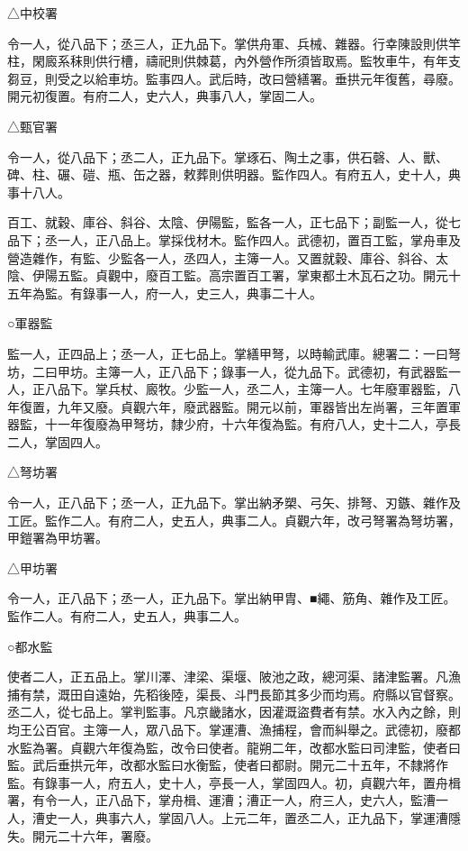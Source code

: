 \begin{pinyinscope}
 △中校署



 令一人，從八品下；丞三人，正九品下。掌供舟軍、兵械、雜器。行幸陳設則供竿柱，閑廄系秣則供行槽，禱祀則供棘葛，內外營作所須皆取焉。監牧車牛，有年支芻豆，則受之以給車坊。監事四人。武后時，改曰營繕署。垂拱元年復舊，尋廢。開元初復置。有府二人，史六人，典事八人，掌固二人。



 △甄官署



 令一人，從八品下；丞二人，正九品下。掌琢石、陶土之事，供石磬、人、獸、碑、柱、碾、磑、瓶、缶之器，敕葬則供明器。監作四人。有府五人，史十人，典事十八人。



 百工、就穀、庫谷、斜谷、太陰、伊陽監，監各一人，正七品下；副監一人，從七品下；丞一人，正八品上。掌採伐材木。監作四人。武德初，置百工監，掌舟車及營造雜作，有監、少監各一人，丞四人，主簿一人。又置就穀、庫谷、斜谷、太陰、伊陽五監。貞觀中，廢百工監。高宗置百工署，掌東都土木瓦石之功。開元十五年為監。有錄事一人，府一人，史三人，典事二十人。



 ○軍器監



 監一人，正四品上；丞一人，正七品上。掌繕甲弩，以時輸武庫。總署二：一曰弩坊，二曰甲坊。主簿一人，正八品下；錄事一人，從九品下。武德初，有武器監一人，正八品下。掌兵杖、廄牧。少監一人，丞二人，主簿一人。七年廢軍器監，八年復置，九年又廢。貞觀六年，廢武器監。開元以前，軍器皆出左尚署，三年置軍器監，十一年復廢為甲弩坊，隸少府，十六年復為監。有府八人，史十二人，亭長二人，掌固四人。



 △弩坊署



 令一人，正八品下；丞一人，正九品下。掌出納矛槊、弓矢、排弩、刃鏃、雜作及工匠。監作二人。有府二人，史五人，典事二人。貞觀六年，改弓弩署為弩坊署，甲鎧署為甲坊署。



 △甲坊署



 令一人，正八品下；丞一人，正九品下。掌出納甲胄、■繩、筋角、雜作及工匠。監作二人。有府二人，史五人，典事二人。



 ○都水監



 使者二人，正五品上。掌川澤、津梁、渠堰、陂池之政，總河渠、諸津監署。凡漁捕有禁，溉田自遠始，先稻後陸，渠長、斗門長節其多少而均焉。府縣以官督察。丞二人，從七品上。掌判監事。凡京畿諸水，因灌溉盜費者有禁。水入內之餘，則均王公百官。主簿一人，眾八品下。掌運漕、漁捕程，會而糾舉之。武德初，廢都水監為署。貞觀六年復為監，改令曰使者。龍朔二年，改都水監曰司津監，使者曰監。武后垂拱元年，改都水監曰水衡監，使者曰都尉。開元二十五年，不隸將作監。有錄事一人，府五人，史十人，亭長一人，掌固四人。初，貞觀六年，置舟楫署，有令一人，正八品下，掌舟楫、運漕；漕正一人，府三人，史六人，監漕一人，漕史一人，典事六人，掌固八人。上元二年，置丞二人，正九品下，掌運漕隱失。開元二十六年，署廢。




\end{pinyinscope}
